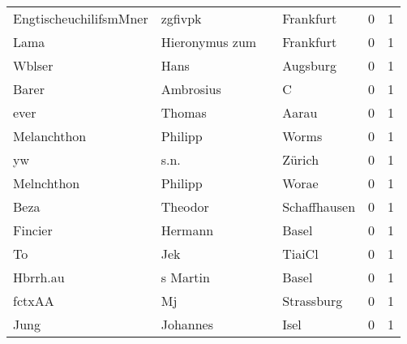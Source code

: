 \begin{center}
\begin{tiny}
\begin{longtabu}{llllrr}
   EngtischeuchilifsmMner &                            zgfivpk &             &                                   Frankfurt &          0 &         1 \\
                     Lama &                     Hieronymus zum &             &                                   Frankfurt &          0 &         1 \\
                   Wblser &                               Hans &             &                                    Augsburg &          0 &         1 \\
                    Barer &                          Ambrosius &             &                                           C &          0 &         1 \\
                     ever &                             Thomas &             &                                       Aarau &          0 &         1 \\
              Melanchthon &                            Philipp &             &                                       Worms &          0 &         1 \\
                       yw &                               s.n. &             &                                      Zürich &          0 &         1 \\
               Melnchthon &                            Philipp &             &                                       Worae &          0 &         1 \\
                     Beza &                            Theodor &             &                                Schaffhausen &          0 &         1 \\
                  Fincier &                            Hermann &             &                                       Basel &          0 &         1 \\
                       To &                                Jek &             &                                      TiaiCl &          0 &         1 \\
                 Hbrrh.au &                           s Martin &             &                                       Basel &          0 &         1 \\
                   fctxAA &                                 Mj &             &                                  Strassburg &          0 &         1 \\
                     Jung &                           Johannes &             &                                        Isel &          0 &         1 \\

\end{longtabu}
\end{tiny}
\end{center}
